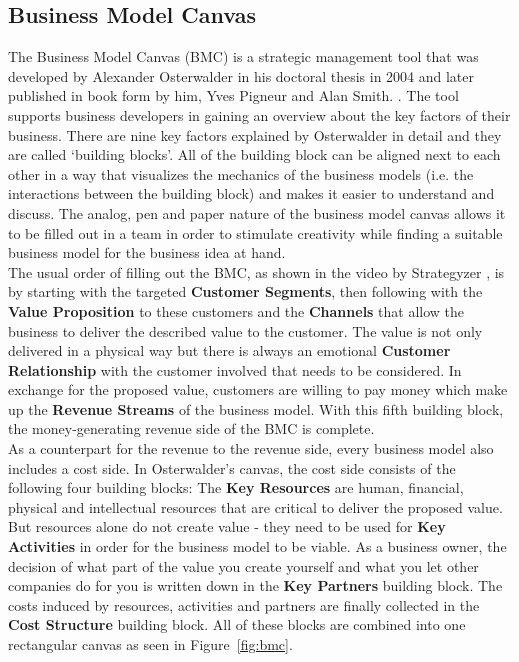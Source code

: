 	\subsection{Business Model Canvas} 
	\label{sec:bmc}
	\vspace{-1em}
		The Business Model Canvas (BMC) is a strategic management tool that was developed by Alexander Osterwalder in his doctoral thesis in 2004 and later published in book form by him, Yves Pigneur and Alan Smith. \cite{osterwalder}. The tool supports business developers in gaining an overview about the key factors of their business. There are nine key factors explained by Osterwalder in detail and they are called `building blocks'. All of the building block can be aligned next to each other in a way that visualizes the mechanics of the business models (i.e. the interactions between the building block) and makes it easier to understand and discuss. The analog, pen and paper nature of the business model canvas allows it to be filled out in a team in order to stimulate creativity while finding a suitable business model for the business idea at hand.\\
		The usual order of filling out the BMC, as shown in the video by Strategyzer \cite{bmc}, is by starting with the targeted \textbf{Customer Segments}, then following with the \textbf{Value Proposition} to these customers and the \textbf{Channels} that allow the business to deliver the described value to the customer. The value is not only delivered in a physical way but there is always an emotional \textbf{Customer Relationship} with the customer involved that needs to be considered. In exchange for the proposed value, customers are willing to pay money which make up the \textbf{Revenue Streams} of the business model. With this fifth building block, the money-generating revenue side of the BMC is complete.\\
		As a counterpart for the revenue to the revenue side, every business model also includes a cost side. In Osterwalder's canvas, the cost side consists of the following four building blocks: The \textbf{Key Resources} are human, financial, physical and intellectual resources that are critical to deliver the proposed value. But resources alone do not create value - they need to be used for \textbf{Key Activities} in order for the business model to be viable. As a business owner, the decision of what part of the value you create yourself and what you let other companies do for you is written down in the \textbf{Key Partners} building block. The costs induced by resources, activities and partners are finally collected in the \textbf{Cost Structure} building block. All of these blocks are combined into one rectangular canvas as seen in Figure~\ref{fig:bmc}.

